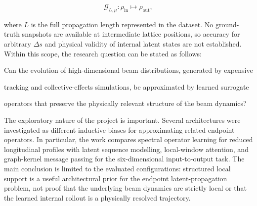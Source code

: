 \begin{equation}
\label{eq:3}
\mathcal{G}_{L,\mu}:\rho_{\mathrm{in}}\mapsto\rho_{\mathrm{out}},
\end{equation}

where \(L\) is the full propagation length represented in the dataset. No ground-truth snapshots are available at intermediate lattice positions, so accuracy for arbitrary \(\Delta s\) and physical validity of internal latent states are not established. Within this scope, the research question can be stated as follows:

Can the evolution of high-dimensional beam distributions, generated by expensive

tracking and collective-effects simulations, be approximated by learned surrogate

operators that preserve the physically relevant structure of the beam dynamics?

The exploratory nature of the project is important. Several architectures were investigated as different inductive biases for approximating related endpoint operators. In particular, the work compares spectral operator learning for reduced longitudinal profiles with latent sequence modelling, local-window attention, and graph-kernel message passing for the six-dimensional input-to-output task. The main conclusion is limited to the evaluated configurations: structured local support is a useful architectural prior for the endpoint latent-propagation problem, not proof that the underlying beam dynamics are strictly local or that the learned internal rollout is a physically resolved trajectory.

